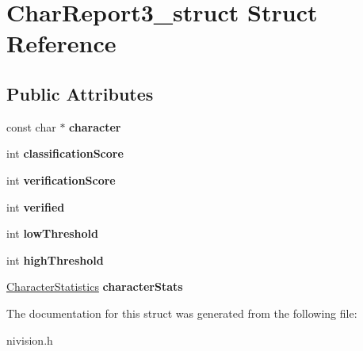\hypertarget{structCharReport3__struct}{
\section{CharReport3\_\-struct Struct Reference}
\label{structCharReport3__struct}
}
\subsection*{Public Attributes}
\begin{DoxyCompactItemize}
\item 
\hypertarget{structCharReport3__struct_a22c590ceca332193c8b275545dbe3b0f}{
const char $\ast$ {\bfseries character}}
\label{structCharReport3__struct_a22c590ceca332193c8b275545dbe3b0f}

\item 
\hypertarget{structCharReport3__struct_abcb5d86d5d0e7882bb29f531a039549a}{
int {\bfseries classificationScore}}
\label{structCharReport3__struct_abcb5d86d5d0e7882bb29f531a039549a}

\item 
\hypertarget{structCharReport3__struct_a3a7883ae8ce8ab3b861c08bfcde1a5f8}{
int {\bfseries verificationScore}}
\label{structCharReport3__struct_a3a7883ae8ce8ab3b861c08bfcde1a5f8}

\item 
\hypertarget{structCharReport3__struct_a1a2f3410a94439c0752c8c41656bffd1}{
int {\bfseries verified}}
\label{structCharReport3__struct_a1a2f3410a94439c0752c8c41656bffd1}

\item 
\hypertarget{structCharReport3__struct_aa57a3a6d78541ef917cd605094674fbd}{
int {\bfseries lowThreshold}}
\label{structCharReport3__struct_aa57a3a6d78541ef917cd605094674fbd}

\item 
\hypertarget{structCharReport3__struct_a559aeac2211bc188b00d834a76b76d2b}{
int {\bfseries highThreshold}}
\label{structCharReport3__struct_a559aeac2211bc188b00d834a76b76d2b}

\item 
\hypertarget{structCharReport3__struct_ae5d57c357e34884488efd530b64ec29c}{
\hyperlink{structCharacterStatistics__struct}{CharacterStatistics} {\bfseries characterStats}}
\label{structCharReport3__struct_ae5d57c357e34884488efd530b64ec29c}

\end{DoxyCompactItemize}


The documentation for this struct was generated from the following file:\begin{DoxyCompactItemize}
\item 
nivision.h\end{DoxyCompactItemize}

